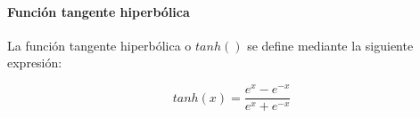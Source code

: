             

            

            \paragraph{Función tangente hiperbólica} \label{sec:tanh}
            La función tangente hiperbólica o $tanh()$ se define mediante la siguiente expresión:

            \begin{equation}\label{eq:tanh}
                tanh(x) = \frac{e^x - e^{-x}}{e^x + e^{-x}}
            \end{equation}


